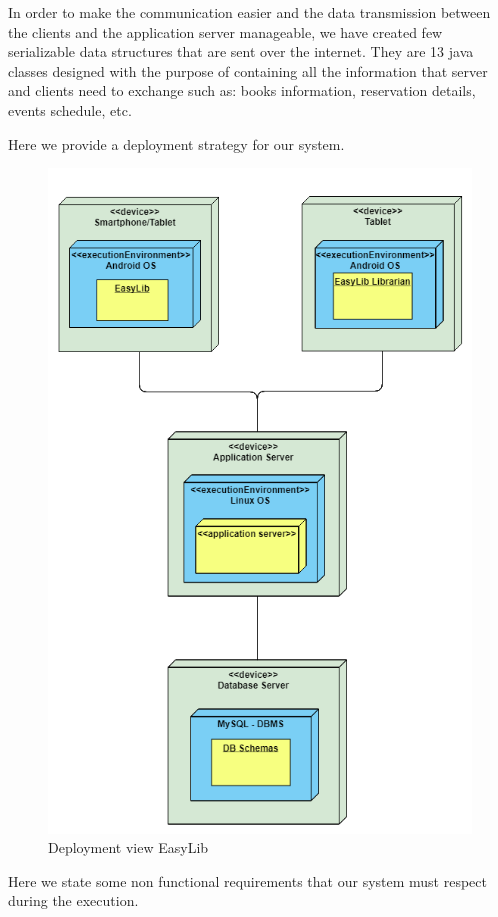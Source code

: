 In order to make the communication easier and the data transmission between the clients and the application server manageable, we have created few serializable data structures that are sent over the internet. They are 13 java classes designed with the purpose of containing all the information that server and clients need to exchange such as: books information, reservation details, events schedule, etc. 

Here we provide a deployment strategy for our system.

\vspace*{0cm}
\begin{figure}[H]
	\centering
	\includegraphics[scale=0.55]{Images/Diagrams/Deployment_view_EasyLib}
	\caption{Deployment view EasyLib}
\end{figure}
Here we state some non functional requirements that our system must respect during the execution.

